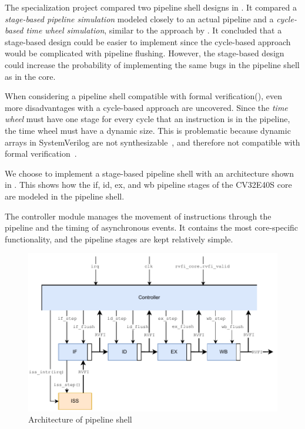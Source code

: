 The specialization project compared two pipeline shell designs in . It compared a \textit{stage-based pipeline simulation} modeled closely to an actual pipeline and a \textit{cycle-based time wheel simulation}, similar to the approach by \textcite{chiangEfficientTwolayeredCycleaccurate2009}. 
It concluded that a stage-based design could be easier to implement since the cycle-based approach would be complicated with pipeline flushing. However, the stage-based design could increase the probability of implementing the same bugs in the pipeline shell as in the core.


When considering a pipeline shell compatible with formal verification(), even more disadvantages with a cycle-based approach are uncovered. 
Since the \textit{time wheel} must have one stage for every cycle that an instruction is in the pipeline, the time wheel must have a dynamic size. This is problematic because dynamic arrays in SystemVerilog are not synthesizable~\cite{mehtaIntroductionSystemVerilog2021}, and therefore not compatible with formal verification~\cite{seligmanFormalVerificationEssential2015}.


We choose to implement a stage-based pipeline shell with an architecture shown in . This shows how the \acrshort{if}, \acrshort{id}, \acrshort{ex}, and \acrshort{wb} pipeline stages of the CV32E40S core are modeled in the pipeline shell. 

The controller module manages the movement of instructions through the pipeline and the timing of asynchronous events. It contains the most core-specific functionality, and the pipeline stages are kept relatively simple. 


\begin{figure}
    \centering
    \includegraphics[width=0.75\linewidth]{figures/Pipeline_shell.pdf}
    \caption{Architecture of pipeline shell}
    \label{fig:pipeline_shell}
\end{figure}


